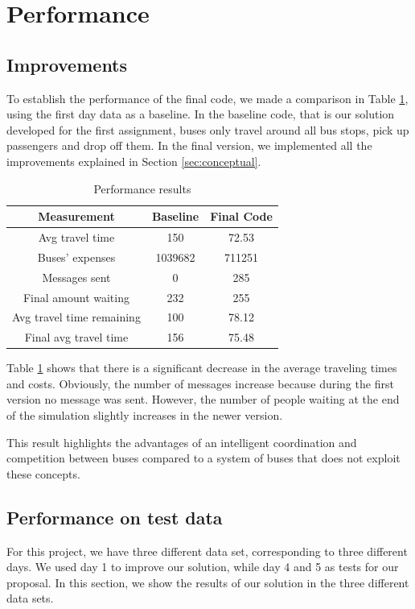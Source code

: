 \section{Performance}
\subsection{Improvements}

To establish the performance of the final code, we made a comparison in Table \ref{table:table1}, using the first day data as a baseline. In the baseline code, that is our solution developed for the first assignment, buses only travel around all bus stops, pick up passengers and drop off them. In the final version, we implemented all the improvements explained in Section \ref{sec:conceptual}.

\begin{table}[htbp]
\centering
\begin{tabular}{ |c|c|c|  }
 \hline
  Measurement & Baseline & Final Code \\
 \hline
  Avg travel time & 150 & 72.53 \\
  Buses' expenses & 1039682 & 711251 \\
  Messages sent & 0 & 285  \\
  Final amount waiting & 232 & 255 \\
  Avg travel time remaining & 100 & 78.12 \\
  Final avg travel time & 156 & 75.48 \\
 \hline
\end{tabular}
\label{table:table1}
\caption{Performance results}
\end{table}

Table \ref{table:table1} shows that there is a significant decrease in the average traveling times and costs. Obviously, the number of messages increase because during the first version no message was sent. However, the number of people waiting at the end of the simulation slightly increases in the newer version.

This result highlights the advantages of an intelligent coordination and competition between buses compared to a system of buses that does not exploit these concepts.

\subsection{Performance on test data}

For this project, we have three different data set, corresponding to three different days. We used day 1 to improve our solution, while day 4 and 5 as tests for our proposal. In this section, we show the results of our solution in the three different data sets.

